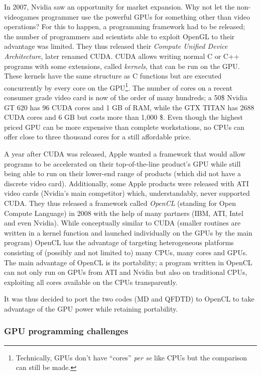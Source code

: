 In 2007, Nvidia saw an opportunity for market expansion. Why not let
the non-videogames programmer use the powerful GPUs for something other than video
operations? For this to happen, a programming framework had to be released; the
number of programmers and scientists able to exploit OpenGL to their advantage
was limited. They thus released their \textit{Compute Unified Device
Architecture}, later renamed CUDA.
CUDA allows writing normal C or
C++ programs with some extensions, called \textit{kernels}, that can be run on
the GPU. These kernels have the same structure as C functions but are executed
concurrently by every core on the GPU\footnote{Technically, GPUs don't have
``cores'' \textit{per se} like CPUs but the comparison can still be made.}. The
number of cores on a recent consumer grade video card is now of the order of
many hundreds; a 50\$ Nvidia GT 620 has 96 CUDA cores and 1 GB of RAM, while the
GTX TITAN has 2688 CUDA cores and 6 GB but costs more than 1,000 \$. Even though
the highest priced GPU can be more expensive than complete workstations, no CPUs
can offer close to three thousand cores for a still affordable price.

A year after CUDA was released, Apple wanted a framework that would allow
programs to be accelerated on their top-of-the-line product's GPU while still
being able to run on their lower-end range of products (which did not have a
discrete video card). Additionally, some Apple products were released with ATI
video cards (Nvidia's main competitor) which, understandably, never supported
CUDA. They thus released a framework called \textit{OpenCL} (standing for
Open Compute Language) in 2008 with the help of many partners (IBM, ATI, Intel
and even Nvidia). While conceptually similar to CUDA (smaller routines are
written in a kernel function and launched individually on the GPUs by the main
program) OpenCL has the advantage of targeting heterogeneous platforms
consisting of (possibly and not limited to) many CPUs, many cores and GPUs. The
main advantage of OpenCL is its portability; a program written in OpenCL can
not only run on GPUs from ATI and Nvidia but also on traditional CPUs,
exploiting all cores available on the CPUs transparently.

It was thus decided to port the two codes (MD and QFDTD) to OpenCL to take
advantage of the GPU power while retaining portability.


\subsubsection{GPU programming challenges}

